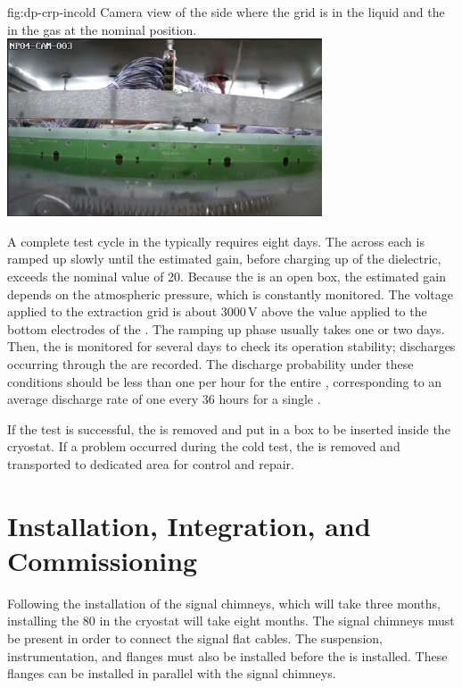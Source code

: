 \begin{dunefigure}
{fig:dp-crp-incold}
{Camera view of the  side where the grid is in the liquid and the  in the gas at the nominal position.}
\includegraphics[width=0.7\textwidth]{graphics/camera3}
\end{dunefigure}

A  complete  test cycle in the \coldbox typically requires eight days. The  across each  is ramped up slowly until the estimated gain, before charging up of the dielectric, exceeds the nominal value of \num{20}. Because the \coldbox is an open box, the estimated gain depends on the atmospheric pressure, which is constantly monitored. The voltage applied to the extraction grid is about 3000\,V above the value applied to the bottom electrodes of the . The  ramping up phase usually takes one or two days. Then, the  is monitored for several days to check its  operation stability; discharges occurring through the  are recorded. The discharge probability under these  conditions should be less than one per hour for the entire , corresponding to an average discharge rate of one every \num{36} hours for a single .

If the test is successful, the  is removed and put in a box to be inserted inside the cryostat. If a problem occurred during the cold test, the  is removed and transported to dedicated area for control and repair. 

\section{Installation, Integration, and Commissioning}
\label{sec:dp-crp-install}
Following the installation of the signal chimneys, which will take three months, installing the \num{80}  in the cryostat will take eight  months. The signal chimneys must be present in order to 
connect the  signal flat cables. The suspension, instrumentation, and  flanges must also be  installed before the  is installed. These flanges can be installed in parallel with the signal chimneys. 

